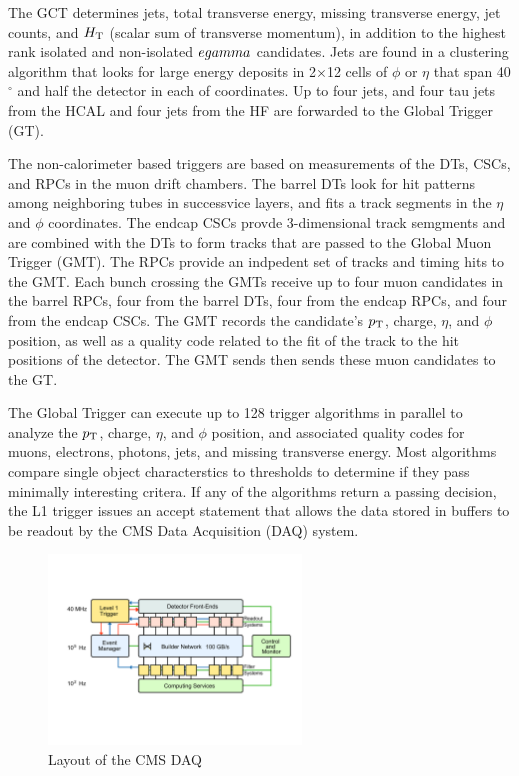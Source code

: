 \par The GCT determines jets, total transverse energy, missing
transverse energy, jet counts, and $H_{\mathrm{T}}$ (scalar sum of transverse
momentum), in addition to the highest rank isolated and non-isolated
$e\/gamma$ candidates.  Jets are found in a clustering algorithm that
looks for large energy deposits in 2$\times$12 cells of $\phi$ or
$\eta$ that span 40$^{\circ}$ and half the detector in each of
coordinates.  Up to four jets, and four tau jets from the HCAL and
four jets from the HF are forwarded to the Global Trigger (GT).  

 \par The non-calorimeter based triggers are based on measurements of
 the DTs, CSCs, and RPCs in the muon drift chambers.  The barrel DTs
 look for hit patterns among neighboring tubes in successvice layers,
 and fits a track segments in the $\eta$ and $\phi$ coordinates.  The
 endcap CSCs provde 3-dimensional track semgments and are combined
 with the DTs to form tracks that are passed to the Global Muon
 Trigger (GMT).  The RPCs provide an indpedent set of tracks and
 timing hits to the GMT.  Each bunch crossing the GMTs receive up to
 four muon candidates in the barrel RPCs, four from the barrel DTs,
 four from the endcap RPCs, and four from the endcap CSCs.  The GMT
 records the candidate's $p_{\mathrm{T}}$, charge, $\eta$, and $\phi$ position,
 as well as a quality code related to the fit of the track to the hit
 positions of the detector.  The GMT sends then sends these muon
 candidates to the GT.  

\par The Global Trigger can execute up to 128 trigger algorithms in
parallel to analyze the $p_{\mathrm{T}}$, charge, $\eta$, and $\phi$ position,
and associated quality codes for muons, electrons, photons, jets, and
missing transverse energy.  Most algorithms compare single object
characterstics to thresholds to determine if they pass minimally
interesting critera.  If any of the algorithms return a passing
decision, the L1 trigger issues an accept statement that allows the
data stored in buffers to be readout by the CMS Data Acquisition (DAQ)
system.  

\begin{figure}[h]
   \centering
  \includegraphics[width=0.6\textwidth]{Figures/CMS_Diagrams/Trigger__DAQ_layout.pdf}
  \caption{Layout of the CMS DAQ} \label{fig:tigger_daq}
\end{figure}

